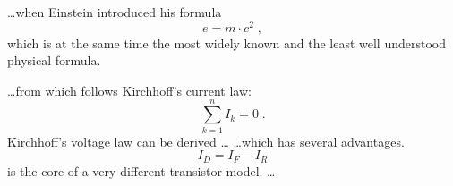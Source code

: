 \documentclass[a4paper,twoside,12pt]{article}
\begin{document}
     \ldots when Einstein introduced his formula
     \begin{equation}
       e = m \cdot c^2 \; ,
     \end{equation}
     which is at the same time the most widely known
     and the least well understood physical formula.\newline\newline
     
     \ldots from which follows Kirchhoff’s current law:
     \begin{equation}
       \sum_{k=1}^{n} I_k = 0 \; .
     \end{equation}
     Kirchhoff’s voltage law can be derived \ldots
     \ldots which has several advantages.
     \begin{equation}
       I_D = I_F - I_R
     \end{equation}
     is the core of a very different transistor model. \ldots
\end{document}
